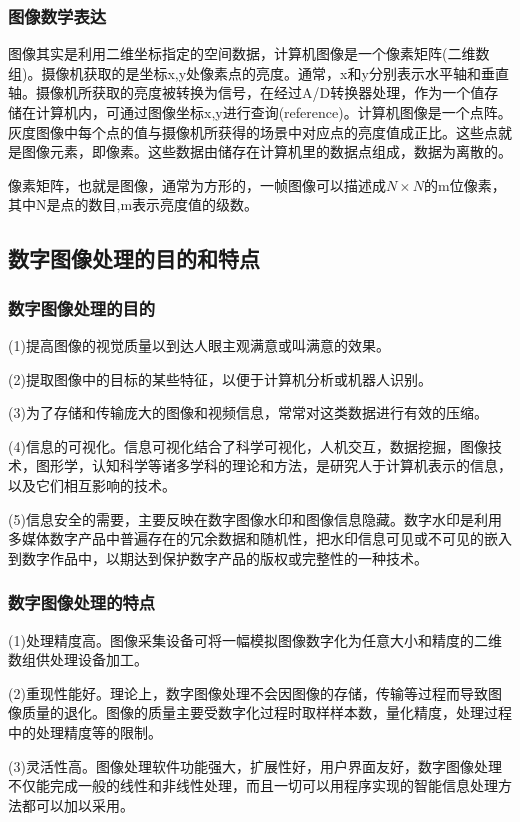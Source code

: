 \documentclass[11pt]{article}
\begin{document}
\subsubsection{图像数学表达}

图像其实是利用二维坐标指定的空间数据，计算机图像是一个像素矩阵(二维数组)。摄像机获取的是坐标x,y处像素点的亮度。通常，x和y分别表示水平轴和垂直轴。摄像机所获取的亮度被转换为信号，在经过A/D转换器处理，作为一个值存储在计算机内，可通过图像坐标x,y进行查询(reference)。计算机图像是一个点阵。灰度图像中每个点的值与摄像机所获得的场景中对应点的亮度值成正比。这些点就是图像元素，即像素。这些数据由储存在计算机里的数据点组成，数据为离散的。

像素矩阵，也就是图像，通常为方形的，一帧图像可以描述成$N\times N$的m位像素，其中N是点的数目,m表示亮度值的级数。
\subsection{数字图像处理的目的和特点}
\subsubsection{数字图像处理的目的}
(1)提高图像的视觉质量以到达人眼主观满意或叫满意的效果。
 
(2)提取图像中的目标的某些特征，以便于计算机分析或机器人识别。

(3)为了存储和传输庞大的图像和视频信息，常常对这类数据进行有效的压缩。

(4)信息的可视化。信息可视化结合了科学可视化，人机交互，数据挖掘，图像技术，图形学，认知科学等诸多学科的理论和方法，是研究人于计算机表示的信息，以及它们相互影响的技术。

(5)信息安全的需要，主要反映在数字图像水印和图像信息隐藏。数字水印是利用多媒体数字产品中普遍存在的冗余数据和随机性，把水印信息可见或不可见的嵌入到数字作品中，以期达到保护数字产品的版权或完整性的一种技术。
\subsubsection{数字图像处理的特点}
(1)处理精度高。图像采集设备可将一幅模拟图像数字化为任意大小和精度的二维数组供处理设备加工。

(2)重现性能好。理论上，数字图像处理不会因图像的存储，传输等过程而导致图像质量的退化。图像的质量主要受数字化过程时取样样本数，量化精度，处理过程中的处理精度等的限制。

(3)灵活性高。图像处理软件功能强大，扩展性好，用户界面友好，数字图像处理不仅能完成一般的线性和非线性处理，而且一切可以用程序实现的智能信息处理方法都可以加以采用。
\end{document}
